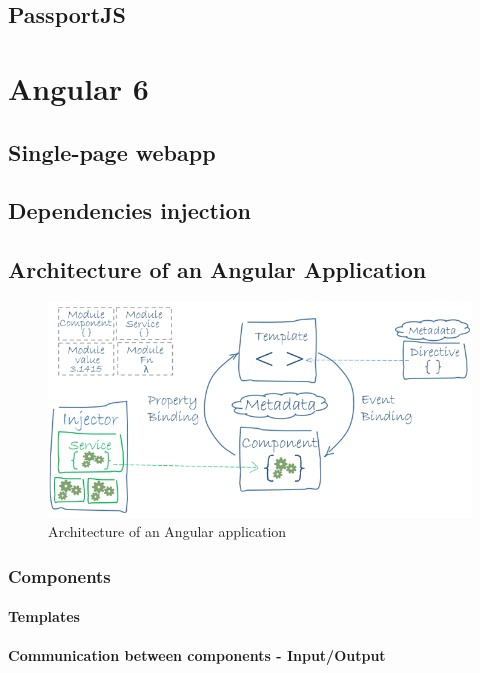 \documentclass[11pt,a4paper]{report}
\begin{document}
\subsection{PassportJS}

\section{Angular 6}
\subsection{Single-page webapp}
\subsection{Dependencies injection}
\subsection{Architecture of an Angular Application}
\begin{figure}[H]
\begin{center}
	\includegraphics[width=.8\textwidth]{assets/angular_architecture}
	\caption[Architecture of an Angular application]{Architecture of an Angular application\cite{angular:ref:architecture}}
\end{center}
\end{figure}
\subsubsection{Components}
\paragraph{Templates}
\paragraph{Communication between components - Input/Output}
\end{document}

